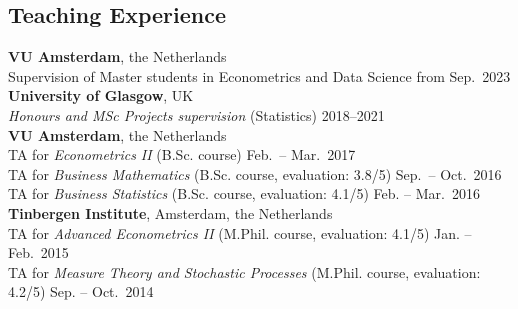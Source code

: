 \documentclass[margin,line]{resume}
\begin{document}
\begin{resume}
\section{\mysidestyle Teaching Experience}
    \textbf{VU Amsterdam}, the Netherlands \\ 
    Supervision of  Master students in Econometrics and Data Science \hfill from Sep.\ 2023  \vspace{2mm}\\   	
    \textbf{University of Glasgow}, UK\\ 
    \textit{Honours and MSc Projects supervision} (Statistics)  \hfill 2018--2021 \vspace{2mm}\\  	
    \textbf{VU Amsterdam}, the Netherlands \\ 
    TA for \textit{Econometrics II} (B.Sc. course)  \hfill Feb.\ -- Mar.\ 2017\\  	
    TA for \textit{Business Mathematics} (B.Sc. course, evaluation: 3.8/5)  \hfill Sep.\ -- Oct.\ 2016\\ 
    TA for \textit{Business Statistics} (B.Sc. course, evaluation: 4.1/5)  \hfill Feb. -- Mar.\ 2016\vspace{2mm}\\
   	\textbf{Tinbergen Institute}, Amsterdam, the Netherlands \\
    TA for \textit{Advanced Econometrics II} (M.Phil. course, evaluation: 4.1/5) \hfill Jan. -- Feb.\ 2015\\      
	TA for \textit{Measure Theory and Stochastic Processes} (M.Phil. course, evaluation: 4.2/5) \hfill Sep. -- Oct.\ 2014\\

\vspace{-5mm}    


\end{resume}
\end{document}
